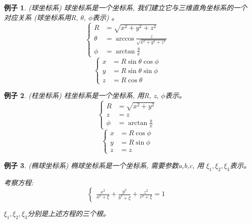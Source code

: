 \documentclass{ctexart}
\numberwithin{equation}{subsection}
\numberwithin{theorem}{subsection}
\numberwithin{definition}{subsection}
\numberwithin{proof}{subsection}
\numberwithin{lemma}{subsection}
\newtheorem{example}    {例子}
\numberwithin{example}{subsection}
\numberwithin{remark}{subsection}
\numberwithin{corollary}{subsection}
\numberwithin{exercise}{subsection}
\numberwithin{problem}{subsection}
\numberwithin{question}{section}
\numberwithin{method}{subsection}
\begin{document}
    \begin{example}
        \label{1.1 ex:spherical coordinate frame}
        (球坐标系) 球坐标系是一个坐标系, 我们建立它与三维直角坐标系的一个
        对应关系 (球坐标系用R, \(\theta\), \(\phi\)表示) 。
        \begin{equation}
            \begin{cases}                
                R &= \sqrt{x^2+y^2+z^2} \\
                \theta &= \arccos\frac{z}{\sqrt{x^2 + y^2 + z^2}} \\
                \phi &= \arctan\frac{y}{x}
            \end{cases}
        \end{equation}
        \begin{equation}
            \begin{cases}
                x &= R \sin\theta \cos\phi \\
                y &= R \sin\theta \sin\phi \\
                z &= R \cos\theta
            \end{cases}
        \end{equation}
    \end{example}

    \begin{example}
        \label{1.1 ex:cylindrical coordinate frame}
        (柱坐标系) 柱坐标系是一个坐标系, 用R, z, \(\phi\)表示。
        \begin{equation}
            \begin{cases}
                R &= \sqrt{x^2+y^2} \\
                z &= z \\
                \phi &= \arctan\frac{y}{x}
            \end{cases}
        \end{equation}
        \begin{equation}
            \begin{cases}
                x &= R \cos\phi \\
                y &= R \sin\phi \\
                z &= z
            \end{cases}
        \end{equation}
    \end{example}

    \begin{example}
        \label{1.1 ex:ellipsoidal coordinates frame}
        (椭球坐标系) 椭球坐标系是一个坐标系, 需要参数a,b,c, 用
        \(\xi_1, \xi_2, \xi_3\)表示。
        
        考察方程:
        \begin{equation}
            \begin{cases}
                \frac{x^2}{a^2 + \xi} + \frac{y^2}{b^2 + \xi} + \frac{z^2}{c^2 + \xi} = 1
            \end{cases}
        \end{equation}

        \(\xi_1,\xi_2,\xi_3\)分别是上述方程的三个根。
    \end{example}
\end{document}
